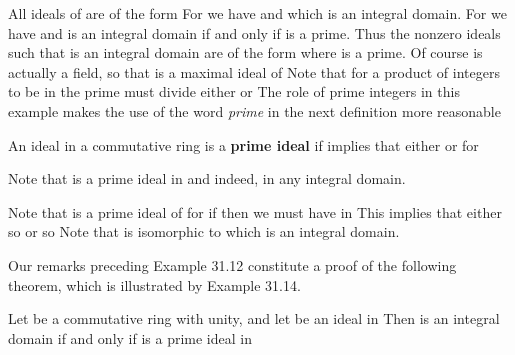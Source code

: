 \documentclass[11pt,oneside]{article}
\begin{document}
\begin{BookBody}
 All ideals of  are of the form  For  we have  and  which is an integral domain. For  we have  and  is an integral domain if and only if  is a prime. Thus the nonzero ideals  such that  is an integral domain are of the form  where  is a prime. Of course is actually a field, so that  is a maximal ideal of  Note that for a product  of integers to be in  the prime  must divide either  or  The role of prime integers in this example makes the use of the word\textit{ prime} in the next definition more reasonable\BookEnd{\blacktriangle}

 An ideal  in a commutative ring  is a\textbf{ prime ideal} if  implies that either  or  for \BookEnd{\blacksquare}

Note that  is a prime ideal in  and indeed, in any integral domain.

 Note that  is a prime ideal of  for if  then we must have  in  This implies that either  so  or  so   Note that  is isomorphic to  which is an integral domain. \BookEnd{\blacktriangle}

Our remarks preceding Example 31.12 constitute a proof of the following theorem, which is illustrated by Example 31.14.

 Let  be a commutative ring with unity, and let  be an ideal in  Then  is an integral domain if and only if  is a prime ideal in 

\end{BookBody}
\end{document}
